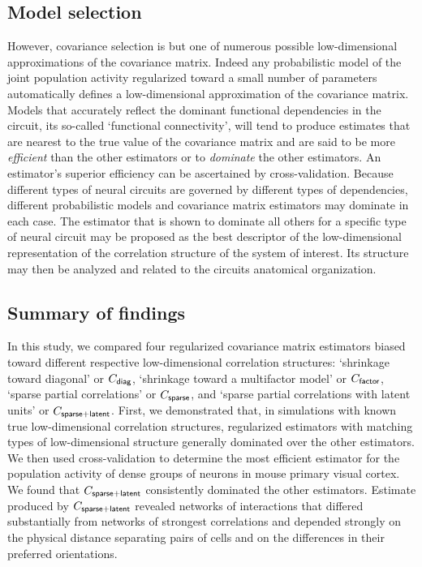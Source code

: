 \documentclass[10pt]{article}
\begin{document}
\subsection*{Model selection}
However, covariance selection is but one of numerous possible low-dimensional approximations of the covariance matrix. Indeed any probabilistic model of the joint population activity regularized toward a small number of parameters automatically defines a low-dimensional approximation of the covariance matrix. Models that accurately reflect the dominant functional dependencies in the circuit, its so-called `functional connectivity', will tend to produce estimates that are nearest to the true value of the covariance matrix and are said to be more \emph{efficient} than the other estimators or to \emph{dominate} the other estimators. An estimator's superior efficiency can be ascertained by cross-validation.  Because different types of neural circuits are governed by different types of dependencies, different probabilistic models and covariance matrix estimators may dominate in each case. The estimator that is shown to dominate all others for a specific type of neural circuit may be proposed as the best descriptor of the low-dimensional representation of the correlation structure of the system of interest. Its structure may then be analyzed and related to the circuits anatomical organization.  

\subsection*{Summary of findings}
In this study, we compared four regularized covariance matrix estimators biased toward different respective low-dimensional correlation structures: `shrinkage toward diagonal' or $C_{\sf diag}$, `shrinkage toward a multifactor model' or $C_{\sf factor}$, `sparse partial correlations' or $C_{\sf sparse}$, and `sparse partial correlations with latent units' or $C_{\sf sparse+latent}$.  First, we demonstrated that, in simulations with known true low-dimensional correlation structures, regularized estimators with matching types of low-dimensional structure generally dominated over the other estimators. We then used cross-validation to determine the most efficient estimator for the population activity of dense groups of neurons in mouse primary visual cortex. We found that $C_{\sf sparse+latent}$ consistently dominated the other estimators.  Estimate produced by $C_{\sf sparse+latent}$ revealed networks of interactions that differed substantially from networks of strongest correlations and depended strongly on the physical distance separating pairs of cells and on the differences in their preferred orientations. 
\end{document}

